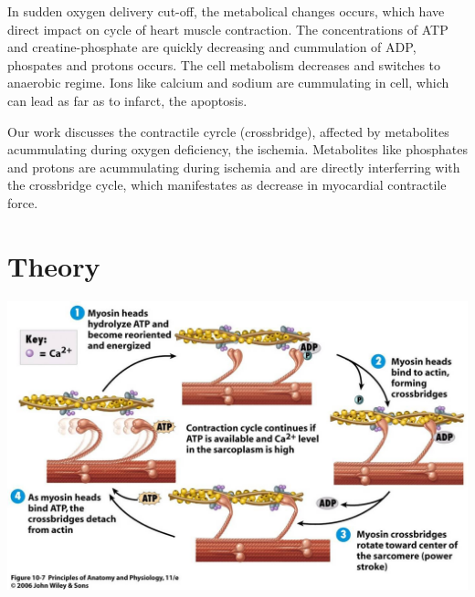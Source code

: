 \documentclass[a0,portrait]{a0poster}
\begin{document}
\begin{multicols}{2}
In sudden oxygen delivery cut-off, the metabolical changes occurs, which
have direct impact on cycle of heart muscle contraction. The
concentrations of ATP and creatine-phosphate are quickly decreasing and
cummulation of ADP, phospates and protons occurs. The cell metabolism
decreases and switches to anaerobic regime. Ions like calcium and sodium
are cummulating in cell, which can lead as far as to infarct, the
apoptosis. 

Our work discusses the contractile cyrcle (crossbridge), affected by
metabolites acummulating during oxygen deficiency, the ischemia.
Metabolites like phosphates and protons are acummulating during ischemia
and are directly interferring with the crossbridge cycle, which
manifestates as decrease in myocardial contractile force.


\color{DarkSlateGray} %

\section*{Theory}

\begin{center}\vspace{0.5cm}
\includegraphics[scale=0.5]{muscle-contraction_hi-res}
\end{center}%


\end{multicols}
\end{document}
